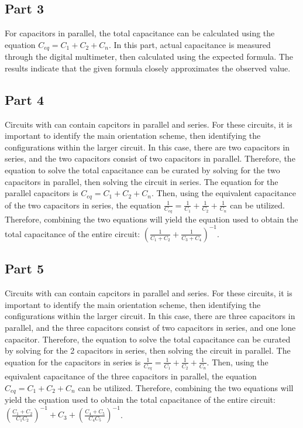 \documentclass[titlepage]{article}
\begin{document}
   	\subsection{Part 3} 
	For capacitors in parallel, the total capacitance can be calculated using the equation ${C_{eq}} = C_1 + C_2 + C_n$. In this part, actual capacitance is measured through the digital multimeter, then calculated using the expected formula. The results indicate that the given formula closely approximates the observed value. 

   	\subsection{Part 4} 
	Circuits with can contain capcitors in parallel and series. For these circuits, it is important to identify the main orientation scheme, then identifying the configurations within the larger circuit. In this case, there are two capacitors in series, and the two capacitors consist of two capacitors in parallel. Therefore, the equation to solve the total capacitance can be curated by solving for the two capacitors in parallel, then solving the circuit in series. The equation for the parallel capacitors is  ${C_{eq}} = C_1 + C_2 + C_n$. Then, using the equivalent capacitance of the two capacitors in series, the equation $\frac{1}{C_{eq}} = \frac{1}{C_1} + \frac{1}{C_2} + \frac{1}{C_n}$ can be utilized. Therefore, combining the two equations will yield the equation used to obtain the total capacitance of the entire circuit: $\left(\frac{1}{C_1 + C_2} + \frac{1}{C_3 + C_4}\right)^{-1}$.
	\subsection{Part 5} 
	Circuits with can contain capcitors in parallel and series. For these circuits, it is important to identify the main orientation scheme, then identifying the configurations within the larger circuit. In this case, there are three capacitors in parallel, and the three capacitors consist of two capacitors in series, and one lone capacitor. Therefore, the equation to solve the total capacitance can be curated by solving for the 2 capacitors in series, then solving the circuit in parallel. The equation for the capacitors in series  is  $\frac{1}{C_{eq}} = \frac{1}{C_1} + \frac{1}{C_2} + \frac{1}{C_n}$. Then, using the equivalent capacitance of the three capacitors in parallel, the equation ${C_{eq}} = C_1 + C_2 + C_n$ can be utilized. Therefore, combining the two equations will yield the equation used to obtain the total capacitance of the entire circuit: $\left(\frac{C_1+C_2}{C_1 C_2}\right)^{-1}+ C_3 +\left(\frac{C_4+C_5}{C_4 C_5}\right)^{-1}$.
\end{document}
